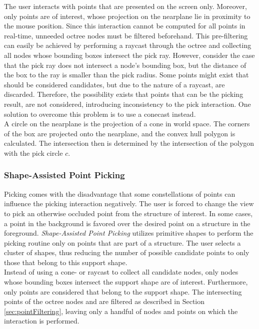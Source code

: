 The user interacts with points that are presented on the screen only. Moreover, only points are of interest, whose projection on the nearplane lie in proximity to the mouse position. Since this interaction cannot be computed for all points in real-time, unneeded octree nodes must be filtered beforehand. This pre-filtering can easily be achieved by performing a raycast through the octree and collecting all nodes whose bounding boxes intersect the pick ray. However, consider the case that the pick ray does not intersect a node's bounding box, but the distance of the box to the ray is smaller than the pick radius. Some points might exist that should be considered candidates, but due to the nature of a raycast, are discarded. Therefore, the possibility exists that points that can be the picking result, are not considered, introducing inconsistency to the pick interaction. One solution to overcome this problem is to use a conecast instead. 
\\
A circle on the nearplane is the projection of a cone in world space. The corners of the box are projected onto the nearplane, and the convex hull polygon is calculated. The intersection then is determined by the intersection of the polygon with the pick circle $c$. 


\subsubsection{Shape-Assisted Point Picking}
\label {sec:picking_assisted}

Picking comes with the disadvantage that some constellations of points can influence the picking interaction negatively. The user is forced to change the view to pick an otherwise occluded point from the structure of interest. In some cases, a point in the background is favored over the desired point on a structure in the foreground. \textit{Shape-Assisted Point Picking} utilizes primitive shapes to perform the picking routine only on points that are part of a structure. The user selects a cluster of shapes, thus reducing the number of possible candidate points to only those that belong to this support shape. 
\\ 
Instead of using a cone- or raycast to collect all candidate nodes, only nodes whose bounding boxes intersect the support shape are of interest. Furthermore, only points are considered that belong to the support shape. The intersecting points of the octree nodes and are filtered as described in Section \ref{sec:pointFiltering}, leaving only a handful of nodes and points on which the interaction is performed. 
\\
